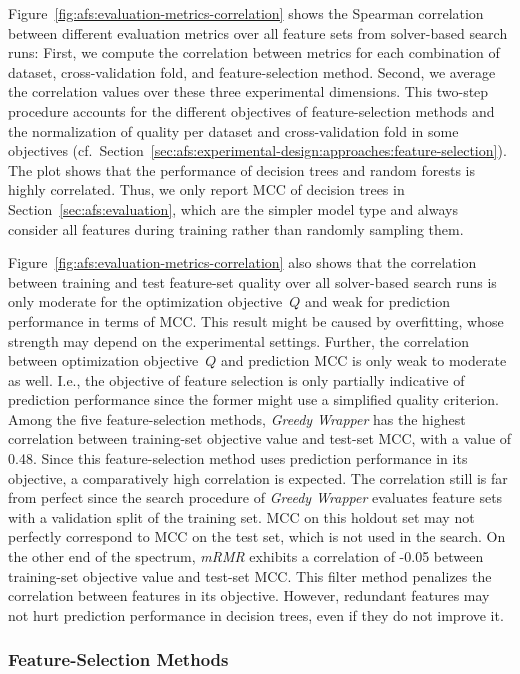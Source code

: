 \documentclass{article}
\theoremstyle{definition}
\begin{document}
Figure~\ref{fig:afs:evaluation-metrics-correlation} shows the Spearman correlation between different evaluation metrics over all feature sets from solver-based search runs:
First, we compute the correlation between metrics for each combination of dataset, cross-validation fold, and feature-selection method.
Second, we average the correlation values over these three experimental dimensions.
This two-step procedure accounts for the different objectives of feature-selection methods and the normalization of quality per dataset and cross-validation fold in some objectives (cf.~Section~\ref{sec:afs:experimental-design:approaches:feature-selection}).
The plot shows that the performance of decision trees and random forests is highly correlated.
Thus, we only report MCC of decision trees in Section~\ref{sec:afs:evaluation}, which are the simpler model type and always consider all features during training rather than randomly sampling them.

Figure~\ref{fig:afs:evaluation-metrics-correlation} also shows that the correlation between training and test feature-set quality over all solver-based search runs is only moderate for the optimization objective~$Q$ and weak for prediction performance in terms of MCC.
This result might be caused by overfitting, whose strength may depend on the experimental settings.
Further, the correlation between optimization objective~$Q$ and prediction MCC is only weak to moderate as well.
I.e., the objective of feature selection is only partially indicative of prediction performance since the former might use a simplified quality criterion.
Among the five feature-selection methods, \emph{Greedy Wrapper} has the highest correlation between training-set objective value and test-set MCC, with a value of 0.48.
Since this feature-selection method uses prediction performance in its objective, a comparatively high correlation is expected.
The correlation still is far from perfect since the search procedure of \emph{Greedy Wrapper} evaluates feature sets with a validation split of the training set.
MCC on this holdout set may not perfectly correspond to MCC on the test set, which is not used in the search.
On the other end of the spectrum, \emph{mRMR} exhibits a correlation of -0.05 between training-set objective value and test-set MCC.
This filter method penalizes the correlation between features in its objective.
However, redundant features may not hurt prediction performance in decision trees, even if they do not improve it.

\subsubsection{Feature-Selection Methods}
\label{sec:afs:appendix:evaluation:feature-selection}
\end{document}
